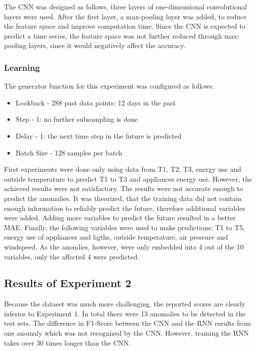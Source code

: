The CNN was designed as follows, three layers of one-dimensional convolutional layers were used. After the first layer, a max-pooling layer was added, to reduce the feature space and improve computation time. Since the CNN is expected to predict a time series, the feature space was not further reduced through max-pooling layers, since it would negatively affect the accuracy.  

\subsubsection{Learning}
The generator function for this experiment was configured as follows:

\begin{itemize}
	\item Lookback - 288 past data points: 12 days in the past
	\item Step - 1: no further subsampling is done
	\item Delay - 1: the next time step in the future is predicted
	\item Batch Size - 128 samples per batch
\end{itemize}

First experiments were done only using data from T1, T2, T3, energy use and outside temperature to predict T1 to T3 and appliances energy use. However, the achieved results were not satisfactory. The results were not accurate enough to predict the anomalies. It was theorized, that the training data did not contain enough information to reliably predict the future, therefore additional variables were added. Adding more variables to predict the future resulted in a better MAE. Finally, the following variables were used to make predictions: T1 to T5, energy use of appliances and ligths, outside temperature, air pressure and windspeed. As the anomlies, however, were only embedded into 4 out of the 10 variables, only the affected 4 were predicted.


\subsection{Results of Experiment 2}
Because the dataset was much more challenging, the reported scores are clearly inferior to Experiment 1. In total there were 13 anomalies to be detected in the test sets. The difference in F1-Score between the CNN and the RNN results from one anomaly which was not recognized by the CNN. However, training the RNN takes over 30 times longer than the CNN.

